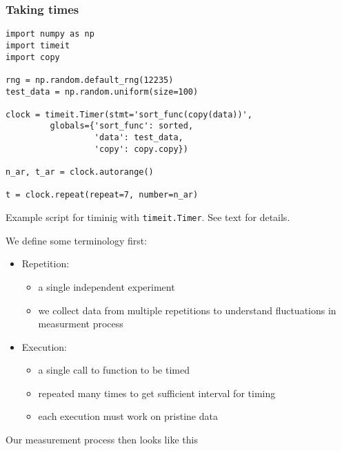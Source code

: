 \documentclass[sigconf, nonacm, natbib, screen, balance=False]{acmart}
\begin{document}
\subsubsection{Taking times}

\begin{listing}
\begin{lstlisting}
import numpy as np
import timeit
import copy

rng = np.random.default_rng(12235)
test_data = np.random.uniform(size=100)

clock = timeit.Timer(stmt='sort_func(copy(data))',
         globals={'sort_func': sorted,
                  'data': test_data,
                  'copy': copy.copy})

n_ar, t_ar = clock.autorange()

t = clock.repeat(repeat=7, number=n_ar)
\end{lstlisting}
  \caption{Example script for timinig with \texttt{timeit.Timer}. See
    text for details.}
  \label{lst:timeit}
\end{listing}

We define some terminology first:
  \begin{itemize}
    \item
    Repetition:

    \begin{itemize}
        \item
      a single independent experiment
    \item
      we collect data from multiple repetitions to understand
      fluctuations in measurment process
    \end{itemize}
  \item
    Execution:

    \begin{itemize}
        \item
      a single call to function to be timed
    \item
      repeated many times to get sufficient interval for timing
    \item
      each execution must work on pristine data
    \end{itemize}
  \end{itemize}



Our measurement process then looks like this
\end{document}
